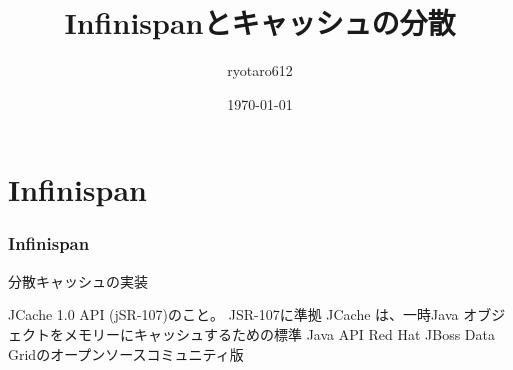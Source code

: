 \documentclass[unicode, 14pt, aspectratio=169]{beamer}
\date{\today}
\title{Infinispanとキャッシュの分散}
\author{ryotaro612}
\begin{document}
\begin{frame}
  \titlepage
\end{frame}
\section{Infinispan}
\begin{frame}
  \frametitle{Infinispan}
  {\large 分散キャッシュの実装}
  \par
  \vfill
  JCache 1.0 API (jSR-107)のこと。
  JSR-107に準拠\supercite{jsr-107}
  JCache は、一時Java オブジェクトをメモリーにキャッシュするための標準 Java API
  Red Hat JBoss Data Gridのオープンソースコミュニティ版\supercite{data-grid}
\end{frame}
\end{document}
